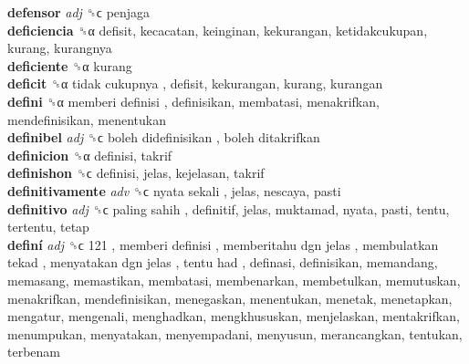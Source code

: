 \textbf{defensor} \emph{adj}  ␝ϲ  penjaga  \\
\textbf{deficiencia} ␝α  defisit, kecacatan, keinginan, kekurangan, ketidakcukupan, kurang, kurangnya  \\
\textbf{deficiente} ␝α  kurang  \\
\textbf{deficit} ␝α   tidak cukupnya , defisit, kekurangan, kurang, kurangan  \\
\textbf{defini} ␝α   memberi definisi , definisikan, membatasi, menakrifkan, mendefinisikan, menentukan  \\
\textbf{definibel} \emph{adj}  ␝ϲ   boleh didefinisikan ,  boleh ditakrifkan   \\
\textbf{definicion} ␝α  definisi, takrif  \\
\textbf{definishon} ␝ϲ  definisi, jelas, kejelasan, takrif  \\
\textbf{definitivamente} \emph{adv}  ␝ϲ   nyata sekali , jelas, nescaya, pasti  \\
\textbf{definitivo} \emph{adj}  ␝ϲ   paling sahih , definitif, jelas, muktamad, nyata, pasti, tentu, tertentu, tetap  \\
\textbf{definí} \emph{adj}  ␝ϲ   121 ,  memberi definisi ,  memberitahu dgn jelas ,  membulatkan tekad ,  menyatakan dgn jelas ,  tentu had , definasi, definisikan, memandang, memasang, memastikan, membatasi, membenarkan, membetulkan, memutuskan, menakrifkan, mendefinisikan, menegaskan, menentukan, menetak, menetapkan, mengatur, mengenali, menghadkan, mengkhususkan, menjelaskan, mentakrifkan, menumpukan, menyatakan, menyempadani, menyusun, merancangkan, tentukan, terbenam  \\
